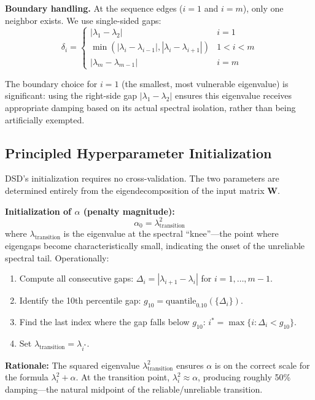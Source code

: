 \documentclass[preprint,review,12pt]{elsarticle}
\begin{document}
\textbf{Boundary handling.} At the sequence edges ($i{=}1$ and $i{=}m$), only one neighbor exists. We use single-sided gaps:
\begin{equation}
\delta_i = \begin{cases}
|\lambda_1 - \lambda_2| & i = 1 \\
\min(|\lambda_i - \lambda_{i-1}|, |\lambda_i - \lambda_{i+1}|) & 1 < i < m \\
|\lambda_m - \lambda_{m-1}| & i = m
\end{cases}
\label{eq:eigengap_boundary}
\end{equation}

The boundary choice for $i{=}1$ (the smallest, most vulnerable eigenvalue) is significant: using the right-side gap $|\lambda_1 - \lambda_2|$ ensures this eigenvalue receives appropriate damping based on its actual spectral isolation, rather than being artificially exempted.

\subsection{Principled Hyperparameter Initialization}
\label{sec:initialization}

DSD's initialization requires no cross-validation. The two parameters are determined entirely from the eigendecomposition of the input matrix $\bm{W}$.

\textbf{Initialization of $\alpha$ (penalty magnitude):}
\begin{equation}
\alpha_0 = \lambda_{\text{transition}}^2
\label{eq:alpha_init}
\end{equation}
where $\lambda_{\text{transition}}$ is the eigenvalue at the spectral ``knee''---the point where eigengaps become characteristically small, indicating the onset of the unreliable spectral tail. Operationally:
\begin{enumerate}
\item Compute all consecutive gaps: $\Delta_i = |\lambda_{i+1} - \lambda_i|$ for $i = 1, \ldots, m{-}1$.
\item Identify the 10th percentile gap: $g_{10} = \text{quantile}_{0.10}(\{\Delta_i\})$.
\item Find the last index where the gap falls below $g_{10}$: $i^* = \max\{i : \Delta_i < g_{10}\}$.
\item Set $\lambda_{\text{transition}} = \lambda_{i^*}$.
\end{enumerate}

\textbf{Rationale:} The squared eigenvalue $\lambda_{\text{transition}}^2$ ensures $\alpha$ is on the correct scale for the formula $\lambda_i^2 + \alpha$. At the transition point, $\lambda_i^2 \approx \alpha$, producing roughly 50\% damping---the natural midpoint of the reliable/unreliable transition.
\end{document}
